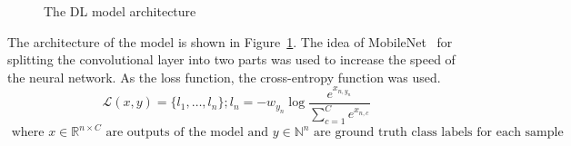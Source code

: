 \begin{figure}[h]
\begin{center}
    \end{center}
    \caption{The DL model architecture}\label{nn_architecture}
\end{figure}
The architecture of the model is shown in Figure~\ref{nn_architecture}. The idea of MobileNet~\cite{mobileNet} for splitting the convolutional layer into two parts 
was used to increase the speed of the neural network.
As the loss function, the cross-entropy function was used.
\[ \mathcal{L}(x,y) = \{l_1,\dots,l_n\}; l_n=-w_{y_n}\log\frac{e^{x_{n,y_n}}}{\sum\limits_{c=1}^C e^{x_{n,c}}}\]
\[\text{ where } x\in \mathbb{R}^{n\times C} \text{ are outputs of the model}
\text{ and } y \in \mathbb{N}^n \text{ are ground truth class labels for each sample} \]

